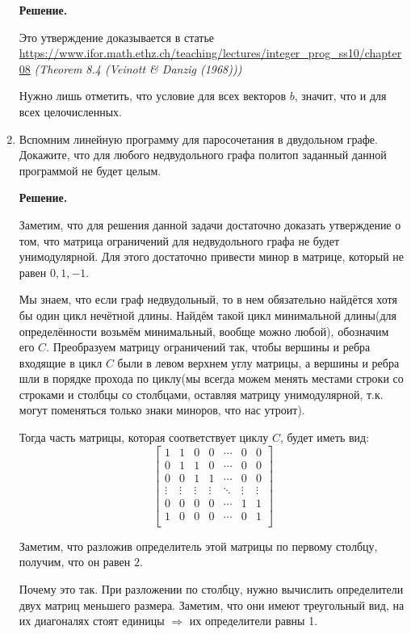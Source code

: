 \begin{enumerate}
	\textbf{Решение.}
	
	Это утверждение доказывается в статье \url{https://www.ifor.math.ethz.ch/teaching/lectures/integer_prog_ss10/chapter08} \textit{(Theorem 8.4 (Veinott \& Danzig (1968)))}
	
	Нужно лишь отметить, что условие для всех векторов $b$, значит, что и для всех целочисленных.
	
	\item Вспомним линейную программу для паросочетания в двудольном графе. Докажите, что для любого 
	недвудольного графа политоп заданный данной программой не будет целым.
	
	\textbf{Решение.}
	
	Заметим, что для решения данной задачи достаточно доказать утверждение о том, что матрица ограничений для 
	недвудольного графа не будет унимодулярной. Для этого достаточно привести минор в матрице, который не равен 
	$0, 1, -1$.
	
	Мы знаем, что если граф недвудольный, то в нем обязательно найдётся хотя бы один цикл нечётной длины. Найдём 
	такой цикл минимальной длины(для определённости возьмём минимальный, вообще можно любой), обозначим его $C$. 
	Преобразуем матрицу ограничений так, чтобы вершины и ребра входящие в цикл $C$ были в левом верхнем углу 
	матрицы, а вершины и ребра шли в порядке прохода по циклу(мы всегда можем менять местами строки со строками и 
	столбцы со столбцами, оставляя матрицу унимодулярной, т.к. могут поменяться только знаки миноров, что нас 
	утроит). 
	
	Тогда часть матрицы, которая соответствует циклу $C$, будет иметь вид:
	\begin{equation*}
		\begin{bmatrix}
		1 & 1 & 0 & 0 & \cdots & 0 & 0\\
		0 & 1 & 1 & 0 & \cdots & 0 & 0\\ 
		0 & 0 & 1 & 1 & \cdots & 0 & 0\\  
		\vdots & \vdots & \vdots & \vdots & \ddots & \vdots & \vdots\\
		0 & 0 & 0 & 0 & \cdots & 1 & 1 \\
		1 & 0 & 0 & 0 & \cdots & 0 & 1 \\
		\end{bmatrix}
	\end{equation*}
	
	Заметим, что разложив определитель этой матрицы по первому столбцу, получим, что он равен $2$. 
	
	Почему это так. При разложении по столбцу, нужно вычислить определители двух матриц меньшего размера. 
	Заметим, что они имеют треугольный вид, на их диагоналях стоят единицы $\Rightarrow$ их определители равны 1.
	

\end{enumerate}
